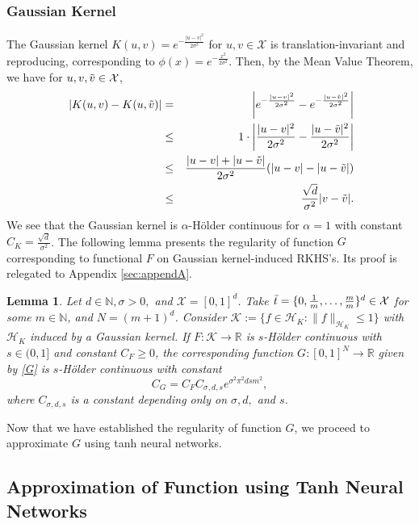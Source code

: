 \documentclass{article}
\def\NN{\mathbb N}
\def\RR{\mathbb R}
\numberwithin{equation}{section}
\newtheorem{lemma}[theorem]{Lemma}
\begin{document}
\subsubsection{Gaussian Kernel}
The Gaussian kernel $K(u,v)= e^{-\frac{|u-v|^2}{2\sigma^2}}$ for $u,v \in \mathcal{X}$ is translation-invariant and reproducing, corresponding to  $\phi(x) = e^{-\frac{x^2}{2\sigma^2}}$. 
 Then, by the Mean Value Theorem, we have for $u,v,\Tilde{v} \in \mathcal{X}$, 
\begin{eqnarray*}     
\  | K(u,v) - K(u,\Tilde{v})| &=& \left|e^{-\frac{|u-v|^2}{2\sigma^2}} - e^{-\frac{|u-\Tilde{v}|^2}{2\sigma^2}}\right| \\
&\leq& 1 \cdot \left|\frac{|u-v|^2}{2\sigma^2} - \frac{|u-\Tilde{v}|^2}{2\sigma^2}\right|\\
&\leq&\frac{|u-v|+|u-\Tilde{v}|}{2\sigma^2} (|u-v|-|u-\Tilde{v}|)\\
&\leq& \frac{\sqrt{d}}{\sigma^2}|v-\Tilde{v}|.
\end{eqnarray*}
We see that the Gaussian kernel is $\alpha$-H\"{o}lder continuous for $\alpha = 1$ with constant $C_K = \frac{\sqrt{d}}{\sigma^2}$. The following lemma presents the regularity of function $G$ corresponding to functional $F$ on Gaussian kernel-induced RKHS's. Its proof is relegated to Appendix \ref{sec:appendA}.

\begin{lemma}\label{lemma:C_G_Gaussian}
    Let $d\in \NN, \sigma >0,$ and $\mathcal{X} = [0,1]^d$. Take $\Bar{t}=\{ 0, \frac{1}{m},\ldots, \frac{m}{m}\}^d \in \mathcal{X}$ for some $m\in \NN$, and $N=(m+1)^d$.
    Consider $
    \mathcal{K} := \{f\in \mathcal{H}_K: \|f\|_{\mathcal{H}_K} \leq 1\}
$ with $\mathcal{H}_K$ induced by a Gaussian kernel. If $F: \mathcal{K}\to \RR$ is  $s$-H\"{o}lder continuous with $s \in (0,1]$ and constant $C_F\geq 0$, the corresponding function $G:[0,1]^N \rightarrow \RR$ given by \eqref{G} is $s$-H\"{o}lder continuous with constant
\begin{equation}\label{C_G_Gaussian}
    C_G = C_FC_{\sigma,d,s}e^{\sigma^2\pi^2 dsm^2}, 
\end{equation}
where $C_{\sigma,d,s}$ is a constant depending only on $\sigma,d,$ and $s$.
\end{lemma}




Now that we have established the regularity of function $G$, we proceed to approximate $G$ using tanh neural networks. 

\subsection{Approximation of Function using Tanh Neural Networks}
\label{subsec:appox}
\end{document}
